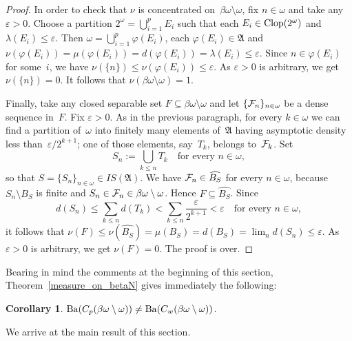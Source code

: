 \documentclass[12pt]{amsart}
\newcommand{\FF}{\protect{\mathcal F}}
\newcommand{\sm}{\setminus}
\newcommand{\sub}{\subseteq}
\newcommand\eps{\ensuremath{\varepsilon}}
\newcommand{\Ba}{{\rm Ba}}
\newcommand{\alg}{\mathfrak A}
\newcommand{\clop}{\protect{\rm Clop} }
\newcommand{\0}{\protect{\bf 0}}
\newcommand{\1}{\protect{\bf 1}}
\newtheorem{cor}[theo]{Corollary}%
\theoremstyle{definition}
\theoremstyle{remark}
\numberwithin{equation}{section}
\def\epsilon{\varepsilon}
\begin{document}
\begin{proof}
In order to check that $\nu$ is concentrated on~$\beta\omega \sm \omega$, fix $n\in \omega$ and take any $\epsilon>0$.
Choose a partition $2^\omega=\bigcup_{i=1}^p E_i$ such that each $E_i\in \clop(2^\omega)$ and $\lambda(E_i)\leq \epsilon$.
Then $\omega=\bigcup_{i=1}^p \varphi(E_i)$, each $\varphi(E_i)\in \alg$ and $\nu(\varphi(E_i))=\mu(\varphi(E_i))=d(\varphi(E_i))=\lambda(E_i) \leq \epsilon$.
Since $n\in \varphi(E_i)$ for some~$i$, we have $\nu(\{n\}) \leq \nu (\varphi(E_i)) \leq \epsilon$. As $\epsilon>0$ is arbitrary, 
we get $\nu(\{n\})=0$. It follows that $\nu(\beta\omega\sm \omega)=1$. 

Finally, take any closed separable set $F\sub \beta\omega\sm \omega$ and
let $\{\FF_n\}_{n\in \omega}$ be a dense sequence in~$F$. Fix $\epsilon>0$. 
As in the previous paragraph, for every $k\in \omega$ we can find a partition of~$\omega$ into finitely
many elements of~$\alg$ having asymptotic density 
less than~$\epsilon/2^{k+1}$; one of those elements, say~$T_k$,
belongs to~$\FF_k$. Set 
$$
	S_n:=\bigcup_{k\leq n}T_k
	\quad\mbox{for every }n\in \omega,
$$ 
so that $S=\{S_n\}_{n\in\omega}\in IS(\alg)$. We have $\FF_n\in \widehat{B_S}$ for every $n \in \omega$, because 
$S_n \sm B_S$ is finite and $S_n\in \FF_n \in \beta\omega \sm \omega$. Hence $F \sub \widehat{B_S}$. Since
$$
	d(S_n)\le \sum_{k\leq n} d(T_k) < \sum_{k\leq n} \frac{\epsilon}{2^{k+1}} < \eps
	\quad\mbox{for every }n\in \omega,
$$
it follows that $\nu(F)\leq \nu(\widehat{B_S})=\mu(B_S)=d(B_S)=\lim_{n}d(S_n) \leq \epsilon$. 
As $\epsilon>0$ is arbitrary, we get $\nu(F)=0$. The proof is over.
\end{proof}

Bearing in mind the comments at the beginning of this section,
Theorem~\ref{measure_on_betaN} gives immediately
the following:

\begin{cor}\label{neq_betaNsmN}
$\Ba(C_p(\beta\omega\sm \omega)) \neq \Ba(C_w(\beta\omega\sm \omega))$.
\end{cor}

We arrive at the main result of this section.
\end{document}
